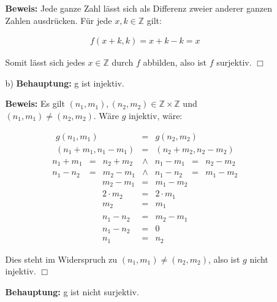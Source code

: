 \documentclass[a4paper]{scrartcl}
\begin{document}
\begin{enumerate}
\begin{enumerate}
                \textbf{Beweis:} Jede ganze Zahl lässt sich als Differenz zweier anderer ganzen Zahlen ausdrücken. 
                Für jede $x, k \in \mathbb{Z}$ gilt:

                $$\begin{array}{rcl}
                    f(x + k, k) = x + k - k = x
                \end{array}$$

                Somit lässt sich jedes $x \in \mathbb{Z}$ durch $f$ abbilden, also
                ist $f$ surjektiv. $\Box$
                
            \item[b)]
                \textbf{Behauptung:} g ist injektiv.
                
                \textbf{Beweis:} Es gilt $(n_1, m_1), (n_2, m_2) \in \mathbb{Z} \times \mathbb{Z}$ und
                $(n_1, m_1) \not= (n_2, m_2)$. Wäre $g$ injektiv, wäre:
                
                $$\begin{array}{rcl}
                    g(n_1, m_1) &=& g(n_2, m_2)\\
                    (n_1 + m_1, n_1 - m_1) &=& (n_2 + m_2, n_2 - m_2)
                \end{array}$$
                $$\begin{array}{rclcrcl}
                    n_1 + m_1 &=& n_2 + m_2 &\wedge& n_1 - m_1 &=& n_2 - m_2\\
                    n_1 - n_2 &=& m_2 - m_1 &\wedge& n_1 - n_2 &=& m_1 - m_2
                \end{array}$$
                $$\begin{array}{rcl}
                    m_2 - m_1 &=& m_1 - m_2\\
                    2 \cdot m_2 &=& 2 \cdot m_1\\
                    m_2 &=& m_1\\
                    \\
                    n_1 - n_2 &=& m_2 - m_1\\
                    n_1 - n_2 &=& 0\\
                    n_1 &=& n_2
                \end{array}$$
                
                Dies steht im Widerspruch zu $(n_1, m_1) \not= (n_2, m_2)$, also ist $g$ nicht injektiv. $\Box$
                
                \textbf{Behauptung:} g ist nicht surjektiv.
                

\end{enumerate}
\end{enumerate}
\end{document}

